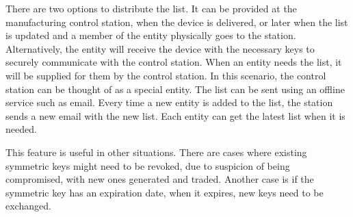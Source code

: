 There are two options to distribute the list.
It can be provided at the manufacturing control station, when the device is delivered, or later when the list is updated and a member of the entity physically goes to the station.
Alternatively, the entity will receive the device with the necessary keys to securely communicate with the control station. When an entity needs the list, it will be supplied for them by the control station. In this scenario, the control station can be thought of as a special entity.
The list can be sent using an offline service such as email. Every time a new entity is added to the list, the station sends a new email with the new list. Each entity can get the latest list when it is needed.

This feature is useful in other situations. There are cases where existing symmetric keys might need to be revoked, due to suspicion of being compromised, with new ones generated and traded.
Another case is if the symmetric key has an expiration date, when it expires, new keys need to be exchanged.
